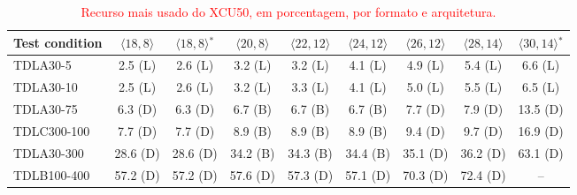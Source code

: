 \begin{table}[htbp]
\caption{\textcolor{red}{Recurso mais usado do XCU50, em porcentagem, por formato e arquitetura.}}
\label{tab:recurso-mais-usado}
\vspace{4pt} %
\centering
\footnotesize
\color{red}
\renewcommand{\arraystretch}{1.2}
\setlength{\tabcolsep}{4pt}
\begin{tabular}{lcccccccc}
\toprule
\textbf{Test condition} & \textbf{$\langle 18,8\rangle$} & \textbf{$\langle 18,8\rangle$$^{*}$} & \textbf{$\langle 20,8\rangle$} & \textbf{$\langle 22,12\rangle$} & \textbf{$\langle 24,12\rangle$} & \textbf{$\langle 26,12\rangle$} & \textbf{$\langle 28,14\rangle$} & \textbf{$\langle 30,14\rangle$$^{*}$} \\
\midrule
TDLA30-5 & 2.5 (L) & 2.6 (L) & 3.2 (L) & 3.2 (L) & 4.1 (L) & 4.9 (L) & 5.4 (L) & 6.6 (L) \\
TDLA30-10 & 2.5 (L) & 2.6 (L) & 3.2 (L) & 3.3 (L) & 4.1 (L) & 5.0 (L) & 5.5 (L) & 6.5 (L) \\
TDLA30-75 & 6.3 (D) & 6.3 (D) & 6.7 (B) & 6.7 (B) & 6.7 (B) & 7.7 (D) & 7.9 (D) & 13.5 (D) \\
TDLC300-100 & 7.7 (D) & 7.7 (D) & 8.9 (B) & 8.9 (B) & 8.9 (B) & 9.4 (D) & 9.7 (D) & 16.9 (D) \\
TDLA30-300 & 28.6 (D) & 28.6 (D) & 34.2 (B) & 34.3 (B) & 34.4 (B) & 35.1 (D) & 36.2 (D) & 63.1 (D) \\
TDLB100-400 & 57.2 (D) & 57.2 (D) & 57.6 (D) & 57.3 (D) & 57.1 (D) & 70.3 (D) & 72.4 (D) & -- \\
\bottomrule
\end{tabular}
\vspace{4pt}
\end{table}
